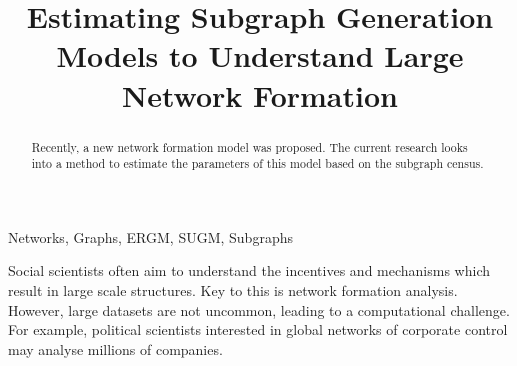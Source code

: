 \documentclass[conference]{IEEEtran}
\begin{document}
\title{Estimating Subgraph Generation Models to Understand Large Network Formation}

\author{
\and
{}
}

\maketitle

\begin{abstract}
Recently, a new network formation model was proposed. The current research looks into a method to estimate the parameters of this model based on the subgraph census.
\end{abstract}

\begin{IEEEkeywords}
Networks, Graphs, ERGM, SUGM, Subgraphs
\end{IEEEkeywords}

Social scientists often aim to understand the incentives and mechanisms which result in large scale structures. Key to this is network formation analysis. However, large datasets are not uncommon, leading to a computational challenge. For example, political scientists interested in global networks of corporate control may analyse millions of companies.
\end{document}
